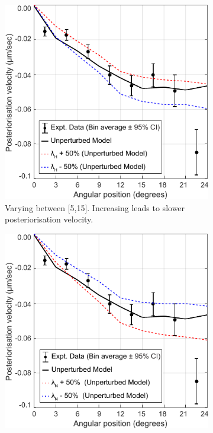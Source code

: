 \begin{figure}
    \centering
    \begin{subfigure}[t]{0.45\textwidth}
        \includegraphics[width=\textwidth]{Results/FigComparePCF/wtPostVelModelLhVary.pdf}
        \caption{Varying \hydrodynamicLength between [\SI{5}{\unitLength},\SI{15}{\unitLength}]. Increasing \hydrodynamicLength leads to slower posteriorisation velocity.}
        \label{subfig:unperturbedModelParameterVary-Lh}
    \end{subfigure}
    \hfill
    \begin{subfigure}[t]{0.45\textwidth}
        \includegraphics[width=\textwidth]{Results/FigComparePCF/wtPostVelModelLnVary.pdf}

\end{subfigure}
\end{figure}
